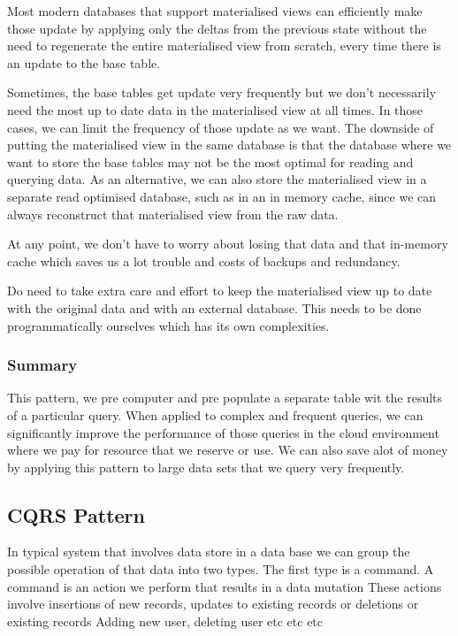 Most modern databases that support materialised views can efficiently make those update by applying only the deltas from the previous state without the need to regenerate the entire materialised view from scratch, every time there is an update to the base table.

Sometimes, the base tables get update very frequently but we don't necessarily need the most up to date data in the materialised view at all times.
In those cases, we can limit the frequency of those update as we want.
The downside of putting the materialised view in the same database is that the database where we want to store the base tables may not be the most optimal for reading and querying data.
As an alternative, we can also store the materialised view in a separate read optimised database, such as in an in memory cache, since we can always reconstruct that materialised view from the raw data.

At any point, we don't have to worry about losing that data and that in-memory cache which saves us a lot trouble and costs of backups and redundancy.

Do need to take extra care and effort to keep the materialised view up to date with the original data and with an external database.
This needs to be done programmatically ourselves which has its own complexities.

\subsubsection{Summary}
This pattern, we pre computer and pre populate a separate table wit the results of a particular query.
When applied to complex and frequent queries, we can significantly improve the performance of those queries in the cloud environment where we pay for resource that we reserve or use.
We can also save alot of money by applying this pattern to large data sets that we query very frequently.

\subsection{CQRS Pattern}
In typical system that involves data store in a data base we can group the possible operation of that data into two types.
The first type is a command.
A command is an action we perform that results in a data mutation
These actions involve insertions of new records, updates to existing records or deletions or existing records
Adding new user, deleting user etc etc etc

